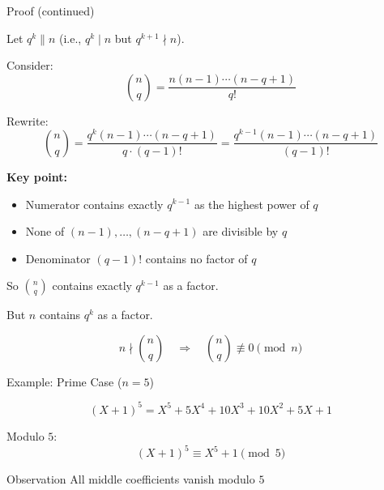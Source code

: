 \documentclass{beamer}
\begin{document}

\begin{frame}{Proof (continued)}

Let $q^k \parallel n$ (i.e., $q^k \mid n$ but $q^{k+1} \nmid n$).

\vspace{0.5em}

Consider:
\[
\binom{n}{q} = \frac{n(n-1)\cdots(n-q+1)}{q!}
\]

\vspace{0.5em}

Rewrite:
\[
\binom{n}{q}
= \frac{q^k (n-1)\cdots(n-q+1)}{q \cdot (q-1)!}
= \frac{q^{k-1}(n-1)\cdots(n-q+1)}{(q-1)!}
\]

\end{frame}
\begin{frame}

\textbf{Key point:}

\begin{itemize}
\item Numerator contains exactly $q^{k-1}$ as the highest power of $q$
\item None of $(n-1), \dots, (n-q+1)$ are divisible by $q$
\item Denominator $(q-1)!$ contains no factor of $q$
\end{itemize}

\vspace{0.5em}

So $\binom{n}{q}$ contains exactly $q^{k-1}$ as a factor.

\vspace{0.5em}

But $n$ contains $q^k$ as a factor.

\[
n \nmid \binom{n}{q}
\quad \Rightarrow \quad
\binom{n}{q} \not\equiv 0 \pmod{n}
\]

\end{frame}



\begin{frame}{Example: Prime Case ($n=5$)}

\[
(X+1)^5 = X^5 + 5X^4 + 10X^3 + 10X^2 + 5X + 1
\]


Modulo $5$:
\[
(X+1)^5 \equiv X^5 + 1 \pmod{5}
\]


\begin{block}{Observation}
All middle coefficients vanish modulo $5$
\end{block}

\end{frame}
\end{document}
